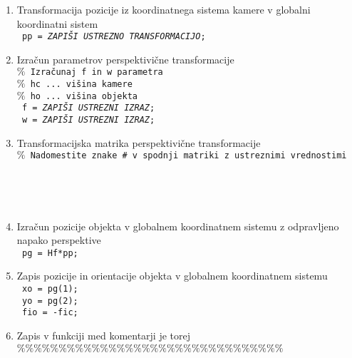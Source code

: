 \begin{mdframed}[backgroundcolor=yellow!20, shadow=true,roundcorner=8pt]
\begin{enumerate}
\item Transformacija pozicije iz koordinatnega sistema kamere v globalni koordinatni sistem
\\ %
\small %
\texttt{    pp = \emph{ZAPIŠI USTREZNO TRANSFORMACIJO};}
\normalsize %
\item Izračun parametrov perspektivične transformacije
\\ %
\small %
\textcolor[rgb]{0.50,0.50,0.50}{\texttt{$\%$  Izračunaj f in w parametra}} \\%
\textcolor[rgb]{0.50,0.50,0.50}{\texttt{$\%$  hc ... višina kamere}} \\%
\textcolor[rgb]{0.50,0.50,0.50}{\texttt{$\%$  ho ... višina objekta}} \\%
\texttt{    f = \emph{ZAPIŠI USTREZNI IZRAZ};} \\
\texttt{    w = \emph{ZAPIŠI USTREZNI IZRAZ};}
\normalsize %
\item Transformacijska matrika perspektivične transformacije
\\ %
\small %
\textcolor[rgb]{0.50,0.50,0.50}{\texttt{$\%$  Nadomestite znake \emph{\#} v spodnji matriki z ustreznimi vrednostimi}} \\%
\texttt{ \tab{w*[} } \\
\texttt{\tab{} \tab{} } \\
\texttt{\tab{} \tab{} } \\
\texttt{\tab{} \tab{} \tab{\emph{\#}  \emph{\#}  \emph{\#}  \emph{\#}];}}
\normalsize %
\item Izračun pozicije objekta v globalnem koordinatnem sistemu z odpravljeno napako perspektive
\\ %
\small %
\texttt{    pg = Hf*pp;}
\normalsize %
\item Zapis pozicije in orientacije objekta v globalnem koordinatnem sistemu
\\ %
\small %
\texttt{    xo = pg(1);} \\
\texttt{    yo = pg(2);} \\
\texttt{    fio = -fic;}
\normalsize %
\item Zapis v funkciji med komentarji je torej
\\ %
\small %
\textcolor[rgb]{0.50,0.50,0.50}{\texttt{$\%\%\%\%\%\%\%\%\%\%\%\%\%\%\%\%\%\%\%\%\%\%\%\%\%\%\%\%\%\%\%\%$ }} \\%

\end{enumerate}
\end{mdframed}
